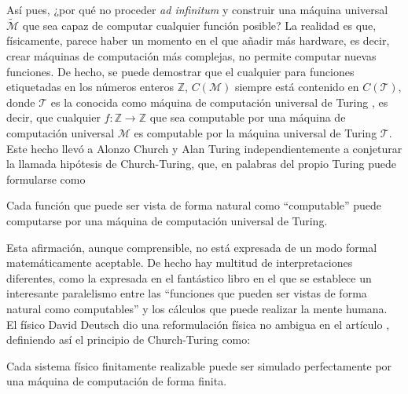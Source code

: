 Así pues, ¿por qué no proceder \textit{ad infinitum} y construir una máquina universal $\tilde{\mathcal{M}}$ que sea capaz de computar cualquier función posible? La realidad es que, físicamente, parece haber un momento en el que añadir más hardware, es decir, crear máquinas de computación más complejas, no permite computar nuevas funciones. De hecho, se puede demostrar que el cualquier para funciones etiquetadas en los números enteros $\mathbb{Z}$, $C(\mathcal{M})$ siempre está contenido en $C(\mathcal{T})$, donde $\mathcal{T}$ es la conocida como máquina de computación universal de Turing \cite{turing1937computable}, es decir, que cualquier $f:\mathbb{Z}\rightarrow\mathbb{Z}$ que sea computable por una máquina de computación universal $\mathcal{M}$ es computable por la máquina universal de Turing $\mathcal{T}$.\\

Este hecho llevó a Alonzo Church \cite{church1936unsolvable} y Alan Turing \cite{turing1937computable} independientemente a conjeturar la llamada hipótesis de Church-Turing, que, en palabras del propio Turing puede formularse como

\begin{hipot} Cada función que puede ser vista de forma natural como ``computable'' puede computarse por una máquina de computación universal de Turing. 
\end{hipot}

Esta afirmación, aunque comprensible, no está expresada de un modo formal matemáticamente aceptable. De hecho hay multitud de interpretaciones diferentes, como la expresada en el fantástico libro \cite{hofstadter1980godel} en el que se establece un interesante paralelismo entre las ``funciones que pueden ser vistas de forma natural como computables'' y los cálculos que puede realizar la mente humana.\\

El físico David Deutsch dio una reformulación física no ambigua en el artículo \cite{1985RSPSA.400...97D}, definiendo así el principio de Church-Turing como:

\begin{ppio}\label{CTH} Cada sistema físico finitamente realizable puede ser simulado perfectamente por una máquina de computación de forma finita.
\end{ppio}

